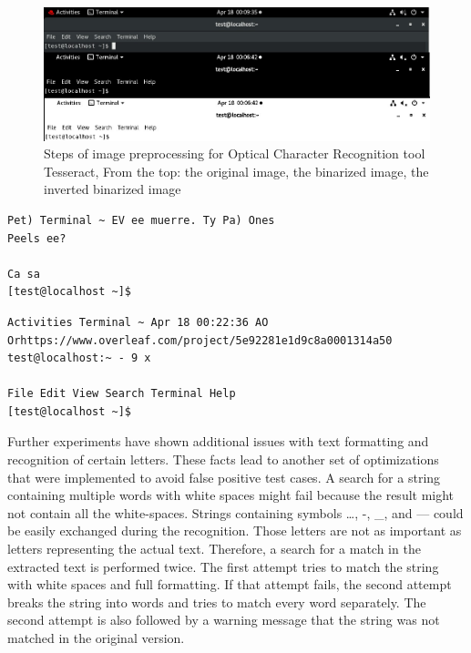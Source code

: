 \begin{figure}[H]
	\centering
	\includegraphics[width=1\textwidth,clip]{obrazky-figures/OCR_conversion.jpg}
	\caption{Steps of image preprocessing for Optical Character Recognition tool Tesseract, From the top: the original image, the binarized image, the inverted binarized image}
	\label{ocr_conversion}
\end{figure}

\begin{lstlisting}[caption={Text generated from the binarized image in Figure \ref{ocr_conversion}},label={OCR_text1}]
Pet) Terminal ~ EV ee muerre. Ty Pa) Ones
Peels ee?

Ca sa
[test@localhost ~]$ 
\end{lstlisting}
\begin{lstlisting}[caption={Text generated from the inverted binarized image in Figure \ref{ocr_conversion}},label={OCR_text2}]
 Activities Terminal ~ Apr 18 00:22:36 AO Orhttps://www.overleaf.com/project/5e92281e1d9c8a0001314a50
test@localhost:~ - 9 x

File Edit View Search Terminal Help
[test@localhost ~]$
\end{lstlisting}

Further experiments have shown additional issues with text formatting and recognition of certain letters. These facts lead to another set of  optimizations that were implemented to avoid false positive test cases. A search for a string containing multiple words with white spaces might fail because the result might not contain all the white-spaces. Strings containing symbols …, -, \_, and — could be easily exchanged during the recognition. Those letters are not as important as letters representing the actual text. Therefore, a search for a match in the extracted text is performed twice. The first attempt tries to match the string with white spaces and full formatting. If that attempt fails, the second attempt breaks the string into words and tries to match every word separately. The second attempt is also followed by a warning message that the string was not matched in the original version.

